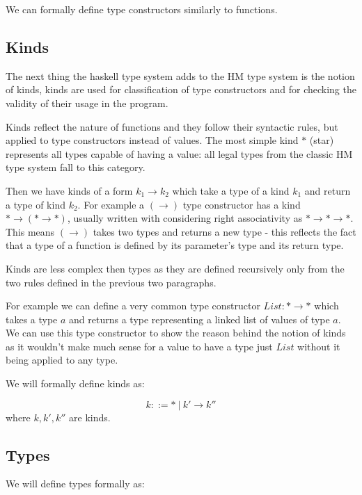 We can formally define type constructors similarly to functions.

\subsection{Kinds}

The next thing the haskell type system adds to the HM type system is the notion of kinds, kinds are used for classification of type constructors and for checking the validity of their usage in the program.

Kinds reflect the nature of functions and they follow their syntactic rules, but applied to type constructors instead of values. The most simple kind $*$ (star) represents all types capable of having a value: all legal types from the classic HM type system fall to this category.

Then we have kinds of a form $k_1 \rightarrow k_2$ which take a type of a kind $k_1$ and return a type of kind $k_2$. For example a $(\rightarrow)$ type constructor has a kind $* \rightarrow (* \rightarrow *)$, usually written with considering right associativity as $* \rightarrow * \rightarrow *$. This means $(\rightarrow)$ takes two types and returns a new type - this reflects the fact that a type of a function is defined by its parameter's type and its return type.

Kinds are less complex then types as they are defined recursively only from the two rules defined in the previous two paragraphs.

For example we can define a very common type constructor $List: * \rightarrow *$ which takes a type $a$ and returns a type representing a linked list of values of type $a$. We can use this type constructor to show the reason behind the notion of kinds as it wouldn't make much sense for a value to have a type just $List$ without it being applied to any type. %

We will formally define kinds as:

\begin{defn}[kinds]
    $$k ::= *\ |\ k' \rightarrow k''$$
    where $k, k', k''$ are kinds.
\end{defn}

\subsection{Types}

We will define types formally as:

